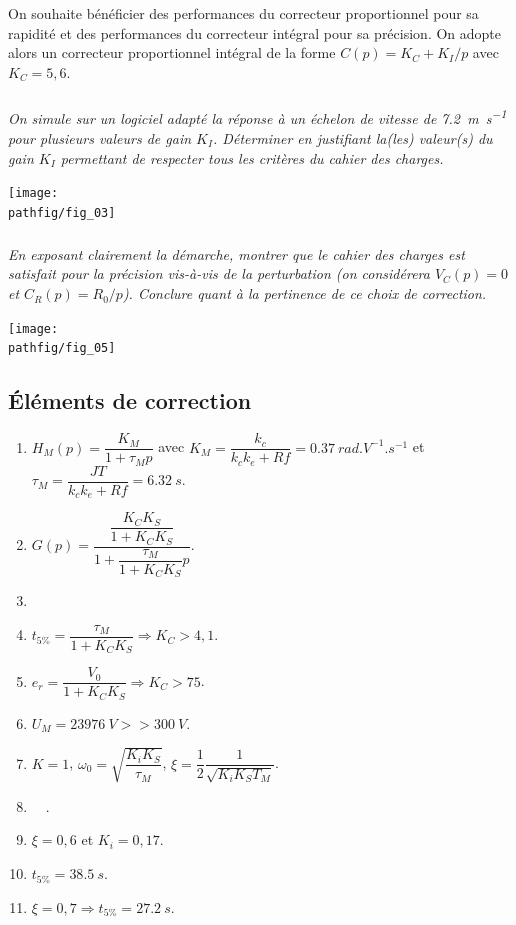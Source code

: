 \documentclass[10pt,fleqn]{article} %
\begin{document}
On souhaite bénéficier des performances du correcteur proportionnel pour sa rapidité et des performances du correcteur intégral pour sa précision.  On adopte alors un correcteur proportionnel intégral de la forme $C(p)=K_C + K_I/p$ avec $K_C = 5,6$.
 
\subparagraph{}\textit{On simule sur un logiciel adapté la réponse à un échelon de vitesse de \SI{7,2}{m.s^{-1}} pour plusieurs valeurs de gain $K_I$. Déterminer en justifiant la(les) valeur(s) du gain $K_I$ permettant de respecter tous les critères du cahier des charges. }


\begin{center}
\texttt{[image: \\pathfig/fig\_03]}
\end{center}

\subparagraph{}\textit{En exposant clairement la démarche, montrer que le cahier des charges est satisfait pour la précision vis-à-vis de la perturbation (on considérera $V_C (p) = 0$  et $C_R (p)=R_0/p$). Conclure quant à la pertinence de ce choix de correction. }


\begin{center}
\texttt{[image: \\pathfig/fig\_05]}
\end{center}

\newpage 

\subsection*{Éléments de correction}
\begin{multicols}{2}
\begin{enumerate}
\item $H_M(p)=\dfrac{K_M}{1+\tau_M p}$ avec $K_M=\dfrac{k_c}{k_ck_e+Rf}=\SI{0,37}{rad.V^{-1}.s^{-1}}$ et $\tau_M=\dfrac{JT}{k_ck_e+Rf}=\SI{6,32}{s}$.
\item $G(p)=\dfrac{\dfrac{K_CK_S}{1+K_CK_S}}{1+\dfrac{\tau_M}{1+K_CK_S}p}$.
\item $\quad$
\item $t_{5\%}=\dfrac{\tau_M}{1+K_CK_S} \Rightarrow K_C>4,1$.
\item $e_r=\dfrac{V_0}{1+K_CK_S} \Rightarrow K_C>75$.
\item $U_M=\SI{23976}{V} >> \SI{300}{V}$.
\item $K=1$, $\omega_0=\sqrt{\dfrac{K_iK_S}{\tau_M}}$, $\xi=\dfrac{1}{2}\dfrac{1}{\sqrt{K_iK_ST_M}}$.
\item $\quad$.
\item $\xi=0,6$ et $K_i=0,17$.
\item $t_{5\%}=\SI{38,5}{s}$.
\item $\xi=0,7\Rightarrow t_{5\%}=\SI{27,2}{s}$.
\end{enumerate}
\end{multicols}
\end{document}
